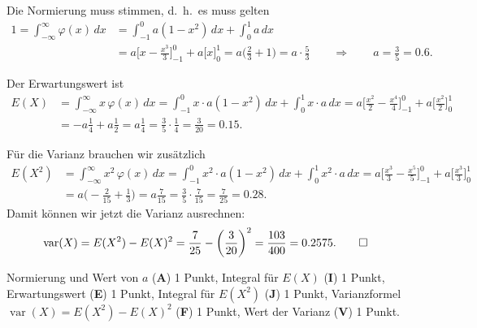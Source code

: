\begin{loesung}
\begin{teilaufgaben}
\item
Die Normierung muss stimmen, d.~h.~es muss gelten
\begin{align*}
1=\int_{-\infty}^{\infty}\varphi(x)\,dx
&=
\int_{-1}^0 a(1-x^2)\,dx
+
\int_{0}^1 a\,dx
\\
&=
a\biggl[x-\frac{x^3}{3}\biggr]_{-1}^0
+
a\biggl[x\biggr]_0^1
=
a\biggl(\frac23+1\biggr)=a\cdot\frac53
\qquad\Rightarrow\qquad a=\frac35 = 0.6.
\end{align*}
\item
Der Erwartungswert ist
\begin{align*}
E(X)
&=
\int_{-\infty}^\infty x\,\varphi(x)\,dx
=
\int_{-1}^0 x\cdot a(1-x^2) \,dx
+
\int_0^1x\cdot a\,dx
=
a\biggl[\frac{x^2}2-\frac{x^4}4\biggr]_{-1}^0
+
a\biggl[\frac{x^2}2\biggr]_0^1
\\
&=
-a\frac14+a\frac12=a\frac14=\frac35\cdot\frac14=\frac{3}{20}=0.15.
\end{align*}
\item
Für die Varianz brauchen wir zusätzlich 
\begin{align*}
E(X^2)
&=
\int_{-\infty}^\infty x^2\,\varphi(x)\,dx
=
\int_{-1}^0 x^2\cdot a(1-x^2)\,dx
+
\int_0^1 x^2\cdot a\,dx
=
a\biggl[\frac{x^3}{3}-\frac{x^5}{5}\biggr]_{-1}^0
+
a\biggl[\frac{x^3}{3}\biggr]_0^1
\\
&=
a\biggl(-\frac2{15}+\frac13\biggr)
=
a\frac{7}{15}
=
\frac{3}{5}\cdot\frac{7}{15}
=
\frac{7}{25}=0.28.
\end{align*}
Damit können wir jetzt die Varianz ausrechnen:
\begin{align*}
\operatorname{var}(X)
&=
E(X^2)-E(X)^2
=
\frac{7}{25}-\biggl(\frac{3}{20}\biggr)^2
=
\frac{103}{400}=0.2575.
\qedhere
\end{align*}
\end{teilaufgaben}
\end{loesung}

\begin{bewertung}
Normierung und Wert von $a$ ({\bf A}) 1 Punkt,
Integral für $E(X)$ ({\bf I}) 1 Punkt,
Erwartungswert ({\bf E}) 1 Punkt,
Integral für $E(X^2)$ ({\bf J}) 1 Punkt,
Varianzformel $\operatorname{var}(X)=E(X^2)-E(X)^2$ ({\bf F}) 1 Punkt,
Wert der Varianz ({\bf V}) 1 Punkt.
\end{bewertung}

